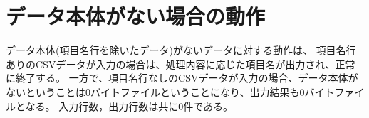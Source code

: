 
%

\section{データ本体がない場合の動作\label{sect:nulldata}}

データ本体(項目名行を除いたデータ)がないデータに対する動作は、
項目名行ありのCSVデータが入力の場合は、処理内容に応じた項目名が出力され、正常に終了する。
一方で、項目名行なしのCSVデータが入力の場合、データ本体がないということは0バイトファイルということになり、出力結果も0バイトファイルとなる。
入力行数，出力行数は共に0件である。



%

